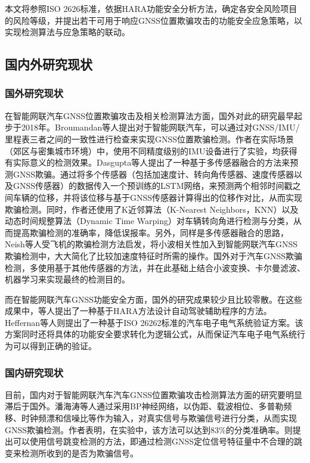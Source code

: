 本文将参照ISO 2626标准，依据HARA功能安全分析方法，确定各安全风险项目的风险等级，并提出若干可用于响应GNSS位置欺骗攻击的功能安全应急策略，以实现检测算法与应急策略的联动。

\subsection{国内外研究现状}
\subsubsection{国外研究现状}
在智能网联汽车GNSS位置欺骗攻击及相关检测算法方面，国外对此的研究最早起步于2018年。Broumandan等人\cite{broumandan2018spoofing}提出对于智能网联汽车，可以通过对GNSS/IMU/里程表三者之间的一致性进行检查来实现GNSS位置欺骗检测。作者在实际场景（郊区与密集城市环境）中，使用不同精度级别的IMU设备进行了实验，均获得有实际意义的检测效果。Dasgupta等人\cite{dasgupta2021sensor}提出了一种基于多传感器融合的方法来预测GNSS欺骗。通过将多个传感器（包括加速度计、转向角传感器、速度传感器以及GNSS传感器）的数据传入一个预训练的LSTM网络，来预测两个相邻时间戳之间车辆的位移，并将该位移与基于GNSS传感器计算得出的位移作对比，从而实现欺骗检测。同时，作者还使用了K近邻算法（K-Nearest Neighbors，KNN）以及动态时间规整算法（Dynamic Time Warping）对车辆转向角进行检测与分类，从而提高欺骗检测的准确率，降低误报率。另外，同样是多传感器融合的思路，Neish等人\cite{neish2018uncoupled}受飞机的欺骗检测方法启发，将小波相关性加入到智能网联汽车GNSS欺骗检测中，大大简化了比较加速度特征时所需的操作。国外对于汽车GNSS欺骗检测，多使用基于其他传感器的方法，并在此基础上结合小波变换、卡尔曼滤波、机器学习来实现最终的检测目的。

而在智能网联汽车GNSS功能安全方面，国外的研究成果较少且比较零散。在这些成果中，\cite{norton2016designing}等人提出了一种基于HARA方法设计自动驾驶辅助程序的方法。Heffernan\cite{heffernan2014runtime}等人则提出了一种基于ISO 26262标准的汽车电子电气系统验证方案。该方案同时还将具体的功能安全要求转化为逻辑公式，从而保证汽车电子电气系统行为可以得到正确的验证。

\subsubsection{国内研究现状}
目前，国内对于智能网联汽车汽车GNSS位置欺骗攻击检测算法方面的研究要明显滞后于国外。潘海涛等人\cite{潘海涛2022基于}通过采用BP神经网络，以伪距、载波相位、多普勒频移、时钟频漂和信噪比等作为输入，对真实信号与欺骗信号进行分类，从而实现GNSS欺骗检测。作者表明，在实验中，该方法可以达到83\%的分类准确率。\cite{李晶0基于}则提出可以使用信号跳变检测的方法，即通过检测GNSS定位信号特征量中不合理的跳变来检测所收到的是否为欺骗信号。

